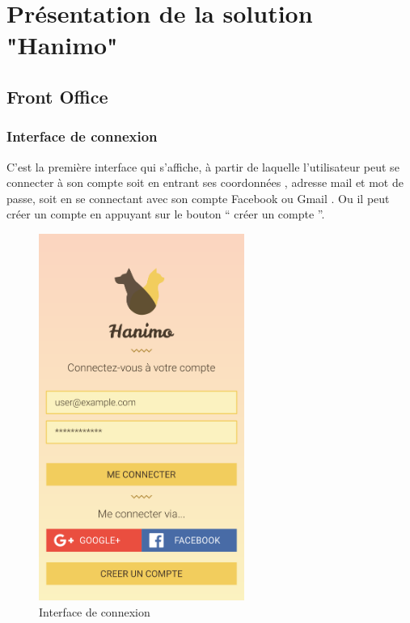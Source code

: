 \documentclass[11pt,a4paper,oneside]{book}
\begin{document}
					\section{Présentation de la solution "Hanimo"}
					\subsection{Front Office}
					\subsubsection{Interface de connexion }
					C’est la première interface qui s’affiche, à partir de laquelle l’utilisateur peut se connecter à son compte soit en entrant ses coordonnées , adresse mail et mot de passe, soit en se connectant avec son compte Facebook ou Gmail . Ou il peut créer un compte en appuyant sur le bouton “ créer un compte ”.
					\begin{figure}[H]
						\centering
						\includegraphics[width=0.6\textwidth]{../Maquettes/Hanimo-maquettes/Output/01-Login-Page-filled}
						\caption{Interface de connexion}
						\label{fig:01-login-page-filled}
					\end{figure}
\end{document}
